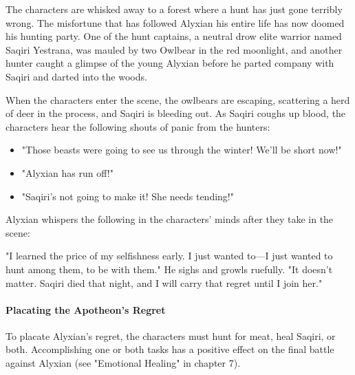 \documentclass[10pt,a4paper,twoside,bg=print,twocolumn,openany,nodeprecatedcode]{dndbook}
\begin{document}
The characters are whisked away to a forest where a hunt has just gone terribly wrong. The misfortune that has followed Alyxian his entire life has now doomed his hunting party. One of the hunt captains, a neutral drow elite warrior named Saqiri Yestrana, was mauled by two Owlbear in the red moonlight, and another hunter caught a glimpse of the young Alyxian before he parted company with Saqiri and darted into the woods.

When the characters enter the scene, the owlbears are escaping, scattering a herd of deer in the process, and Saqiri is bleeding out. As Saqiri coughs up blood, the characters hear the following shouts of panic from the hunters:


\begin{itemize}
\item "Those beasts were going to see us through the winter! We'll be short now!"
\item "Alyxian has run off!"
\item "Saqiri's not going to make it! She needs tending!"
\end{itemize}

Alyxian whispers the following in the characters' minds after they take in the scene:

\begin{DndReadAloud}{}
"I learned the price of my selfishness early. I just wanted to—I just wanted to hunt among them, to be with them." He sighs and growls ruefully. "It doesn't matter. Saqiri died that night, and I will carry that regret until I join her."

\end{DndReadAloud}

\paragraph{Placating the Apotheon's Regret}
To placate Alyxian's regret, the characters must hunt for meat, heal Saqiri, or both. Accomplishing one or both tasks has a positive effect on the final battle against Alyxian (see "Emotional Healing" in chapter 7).
\end{document}
